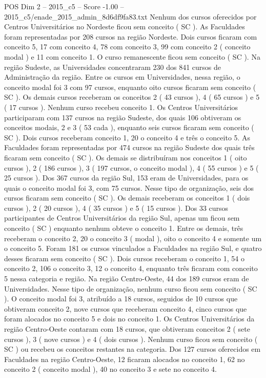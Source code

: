 \begin{textsample}{POS Dim 2 – 2015\_c5 – Score -1.00 – 2015\_c5/enade\_2015\_admin\_8d6df9fa83.txt}
Nenhum dos cursos oferecidos por Centros Universitários no Nordeste ficou sem conceito ( SC ).
As Faculdades foram representadas por 208 cursos na região Nordeste.
Dois cursos ficaram com conceito 5, 17 com conceito 4, 78 com conceito 3, 99 com conceito 2 ( conceito modal ) e 11 com conceito 1.
O curso remanescente ficou sem conceito ( SC ).
Na região Sudeste, as Universidades concentraram 230 dos 841 cursos de Administração da região.
Entre os cursos em Universidades, nessa região, o conceito modal foi 3 com 97 cursos, enquanto oito cursos ficaram sem conceito ( SC ).
Os demais cursos receberam os conceitos 2 ( 43 cursos ), 4 ( 65 cursos ) e 5 ( 17 cursos ).
Nenhum curso recebeu conceito 1.
Os Centros Universitários participaram com 137 cursos na região Sudeste, dos quais 106 obtiveram os conceitos modais, 2 e 3 ( 53 cada ), enquanto seis cursos ficaram sem conceito ( SC ).
Dois cursos receberam conceito 1, 20 o conceito 4 e três o conceito 5.
As Faculdades foram representadas por 474 cursos na região Sudeste dos quais três ficaram sem conceito ( SC ).
Os demais se distribuíram nos conceitos 1 ( oito cursos ), 2 ( 186 cursos ), 3 ( 197 cursos, o conceito modal ), 4 ( 55 cursos ) e 5 ( 25 cursos ).
Dos 367 cursos da região Sul, 153 eram de Universidades, para os quais o conceito modal foi 3, com 75 cursos.
Nesse tipo de organização, seis dos cursos ficaram sem conceito ( SC ).
Os demais receberam os conceitos 1 ( dois cursos ), 2 ( 20 cursos ), 4 ( 35 cursos ) e 5 ( 15 cursos ).
Dos 33 cursos participantes de Centros Universitários da região Sul, apenas um ficou sem conceito ( SC ) enquanto nenhum obteve o conceito 1.
Entre os demais, três receberam o conceito 2, 20 o conceito 3 ( modal ), oito o conceito 4 e somente um o conceito 5.
Foram 181 os cursos vinculados a Faculdades na região Sul, e quatro desses ficaram sem conceito ( SC ).
Dois cursos receberam o conceito 1, 54 o conceito 2, 106 o conceito 3, 12 o conceito 4, enquanto três ficaram com conceito 5 nessa categoria e região.
Na região Centro-Oeste, 44 dos 189 cursos eram de Universidades.
Nesse tipo de organização, nenhum curso ficou sem conceito ( SC ).
O conceito modal foi 3, atribuído a 18 cursos, seguidos de 10 cursos que obtiveram conceito 2, nove cursos que receberam conceito 4, cinco cursos que foram alocados no conceito 5 e dois no conceito 1.
Os Centros Universitários da região Centro-Oeste contaram com 18 cursos, que obtiveram conceitos 2 ( sete cursos ), 3 ( nove cursos ) e 4 ( dois cursos ).
Nenhum curso ficou sem conceito ( SC ) ou recebeu os conceitos restantes na categoria.
Dos 127 cursos oferecidos em Faculdades na região Centro-Oeste, 12 ficaram alocados no conceito 1, 62 no conceito 2 ( conceito modal ), 40 no conceito 3 e sete no conceito 4.

\end{textsample}
